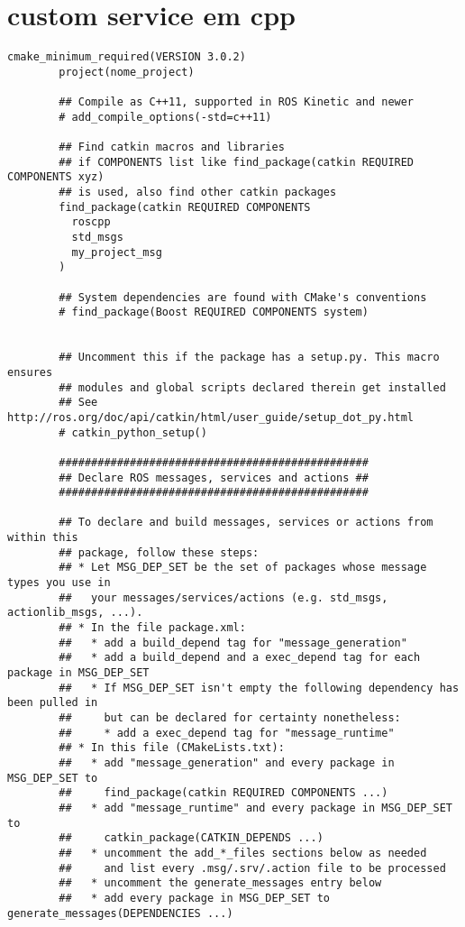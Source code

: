 \documentclass[letterpaper]{article}
\begin{document}
\section{custom service em cpp}
    \begin{itemize}
        \begin{lstlisting}[style=mystyle, title=src/nome\_project/CMakeLists.txt] 
        cmake_minimum_required(VERSION 3.0.2)
        project(nome_project)
        
        ## Compile as C++11, supported in ROS Kinetic and newer
        # add_compile_options(-std=c++11)
        
        ## Find catkin macros and libraries
        ## if COMPONENTS list like find_package(catkin REQUIRED COMPONENTS xyz)
        ## is used, also find other catkin packages
        find_package(catkin REQUIRED COMPONENTS
          roscpp
          std_msgs
          my_project_msg
        )
        
        ## System dependencies are found with CMake's conventions
        # find_package(Boost REQUIRED COMPONENTS system)
        
        
        ## Uncomment this if the package has a setup.py. This macro ensures
        ## modules and global scripts declared therein get installed
        ## See http://ros.org/doc/api/catkin/html/user_guide/setup_dot_py.html
        # catkin_python_setup()
        
        ################################################
        ## Declare ROS messages, services and actions ##
        ################################################
        
        ## To declare and build messages, services or actions from within this
        ## package, follow these steps:
        ## * Let MSG_DEP_SET be the set of packages whose message types you use in
        ##   your messages/services/actions (e.g. std_msgs, actionlib_msgs, ...).
        ## * In the file package.xml:
        ##   * add a build_depend tag for "message_generation"
        ##   * add a build_depend and a exec_depend tag for each package in MSG_DEP_SET
        ##   * If MSG_DEP_SET isn't empty the following dependency has been pulled in
        ##     but can be declared for certainty nonetheless:
        ##     * add a exec_depend tag for "message_runtime"
        ## * In this file (CMakeLists.txt):
        ##   * add "message_generation" and every package in MSG_DEP_SET to
        ##     find_package(catkin REQUIRED COMPONENTS ...)
        ##   * add "message_runtime" and every package in MSG_DEP_SET to
        ##     catkin_package(CATKIN_DEPENDS ...)
        ##   * uncomment the add_*_files sections below as needed
        ##     and list every .msg/.srv/.action file to be processed
        ##   * uncomment the generate_messages entry below
        ##   * add every package in MSG_DEP_SET to generate_messages(DEPENDENCIES ...)
        

\end{lstlisting}
\end{itemize}
\end{document}
